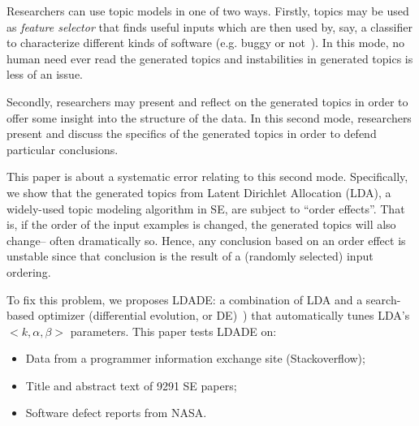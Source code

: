 \documentclass[10pt,conference]{IEEEtran}
\newcommand{\bi}{\begin{itemize}}
\newcommand{\ei}{\end{itemize}}
\theoremstyle{break}
\begin{document}



\noindent
Researchers can use topic models in one of two ways.
Firstly,
topics may be used as {\em feature selector} that finds useful inputs
which are then used by, say, a classifier to characterize different kinds of software (e.g. buggy or not~\cite{chen2016topic}).
In this mode, no human need ever read the generated topics and instabilities
in generated topics is less of an issue.

Secondly, researchers may present and reflect on the generated topics in order to
  offer some insight into the structure of the data.  In this second mode,
  researchers present and discuss the specifics of the generated topics in order
  to defend particular conclusions.

  This paper is about a 
  systematic error relating to this second mode.
  Specifically, we show that the generated topics from Latent Dirichlet
  Allocation (LDA), a widely-used topic modeling algorithm in SE, are subject to
  ``order effects''.  That is, if the order of the input examples is changed,
  the generated topics will also change-- often dramatically so.  Hence, any
  conclusion based on an order effect is unstable since that conclusion is the
  result of a (randomly selected) input ordering. 





To fix this problem,
we proposes LDADE: a  combination of LDA and a search-based optimizer (differential evolution, or DE)~\cite{storn1997differential})
that automatically tunes LDA's \mbox{$<k,\alpha,\beta>$} parameters. This paper tests LDADE on:
\bi
\item Data from a programmer information exchange site (Stackoverflow);
  \item Title and abstract text of
    9291 SE papers;
  \item Software defect reports from NASA.
    \ei
\end{document}
